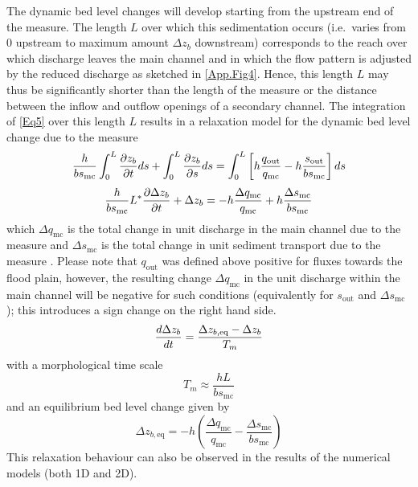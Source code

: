The dynamic bed level changes will develop starting from the upstream end of the measure.
The length $L$ over which this sedimentation occurs (i.e.~varies from 0 upstream to maximum amount $\Delta z_b$ downstream) corresponds to the reach over which discharge leaves the main channel and in which the flow pattern is adjusted by the reduced discharge as sketched in \autoref{App.Fig4}.
Hence, this length $L$ may thus be significantly shorter than the length of the measure or the distance between the inflow and outflow openings of a secondary channel.
The integration of \autoref{Eq5} over this length $L$ results in a relaxation model for the dynamic bed level change due to the measure
%
\begin{equation}
\frac{h}{b s_\text{mc}} \int_0^L \pdiff{z_b}{t} ds + \int_0^L \pdiff{z_b}{s} ds = \int_0^L \left [ h \frac{q_\text{out}}{q_\text{mc}} - h \frac{s_\text{out}}{b s_\text{mc}} \right ] ds
\label{Eq5a}
\end{equation}
%
\begin{equation}
\frac{h}{b s_\text{mc}} L^* \pdiff{\Delta z_b}{t} + \Delta z_b = - h \frac{\Delta q_\text{mc}}{q_\text{mc}} + h \frac{\Delta s_\text{mc}}{b s_\text{mc}}
\label{Eq5b}
\end{equation}
%
which $\Delta q_\text{mc}$ is the total change in unit discharge in the main channel due to the measure  and $\Delta s_\text{mc}$ is the total change in unit sediment transport due to the measure .
Please note that $q_\text{out}$ was defined above positive for fluxes towards the flood plain, however, the resulting change $\Delta q_\text{mc}$ in the unit discharge within the main channel will be negative for such conditions (equivalently for $s_\text{out}$ and $\Delta s_\text{mc}$); this introduces a sign change on the right hand side.
%
\begin{equation}
\diff{\Delta z_b}{t} = \frac{\Delta z_{b,\text{eq}} - \Delta z_b}{T_m}
\label{Eq5dif}
\end{equation}
%
with a morphological time scale 
%
\begin{equation}
T_m \approx \frac{h L}{b s_\text{mc}}
\label{Eq5T}
\end{equation}
%
and an equilibrium bed level change  given by
%
\begin{equation}
\Delta z_{b,\text{eq}} = -h \left ( \frac{\Delta q_\text{mc}}{q_\text{mc}} - \frac{\Delta s_\text{mc}}{b s_\text{mc}} \right )
\label{Eq6}
\end{equation}
%
This relaxation behaviour can also be observed in the results of the numerical models (both 1D and 2D).

